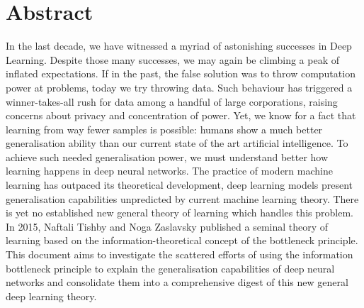 \begingroup
\let\clearpage\relax
\let\cleardoublepage\relax
\let\cleardoublepage\relax

\chapter*{Abstract}
In the last decade, we have witnessed a myriad of astonishing
successes in Deep Learning.
Despite those many successes, we may again be climbing a peak
of inflated expectations.
If in the past, the false solution was to throw computation
power at problems, today we try throwing data.
%
Such behaviour has triggered a winner-takes-all
rush for data among a handful of large corporations,
%
raising concerns about privacy and concentration of power.
Yet, we know for a fact that learning from way fewer samples is possible:
humans show a much better generalisation ability than our current
state of the art artificial intelligence.
To achieve such needed generalisation power, we must
understand better how learning happens in deep neural networks.
The practice of modern machine learning has outpaced its theoretical
development, deep learning models present generalisation capabilities
unpredicted by current machine learning theory.
There is yet no established new general theory of learning which handles
this problem.
In 2015, Naftali Tishby and Noga Zaslavsky published a
seminal theory of learning based on the information-theoretical concept
of the bottleneck principle.
This document aims to investigate the scattered efforts of using the
information bottleneck principle to explain the generalisation capabilities
of deep neural networks and consolidate them into a comprehensive digest
of this new general deep learning theory.
\vfill

